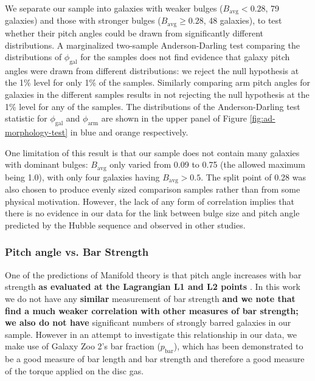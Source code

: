 We separate our sample into galaxies with weaker bulges ($B_\mathrm{avg} < 0.28$, 79 galaxies) and those with stronger bulges ($B_\mathrm{avg} \ge 0.28$, 48 galaxies), to test whether their pitch angles could be drawn from significantly different distributions. A marginalized two-sample Anderson-Darling test comparing the distributions of $\phi_\mathrm{gal}$ for the samples does not find evidence that galaxy pitch angles were drawn from different distributions: we reject the null hypothesis at the 1\% level for only 1\% of the samples. Similarly comparing arm pitch angles for galaxies in the different samples results in not rejecting the null hypothesis at the 1\% level for any of the samples. The distributions of the Anderson-Darling test statistic for $\phi_\mathrm{gal}$ and $\phi_\mathrm{arm}$ are shown in the upper panel of Figure \ref{fig:ad-morphology-test} in blue and orange respectively.

One limitation of this result is that our sample does not contain many galaxies with dominant bulges: $B_\mathrm{avg}$ only varied from 0.09 to 0.75 (the allowed maximum being 1.0), with only four galaxies having $B_\mathrm{avg} > 0.5$. The split point of 0.28 was also chosen to produce evenly sized comparison samples rather than from some physical motivation. However, the lack of any form of correlation implies that there is no evidence in our data for the link between bulge size and pitch angle predicted by the Hubble sequence and observed in other studies.

\subsubsection{Pitch angle vs. Bar Strength}
\label{section:morphology-comparison-bar}

One of the predictions of Manifold theory is that pitch angle increases with bar strength \textbf{as evaluated at the Lagrangian L1 and L2 points}  \citep{2009MNRAS.400.1706A}. In this work we do not have any \textbf{similar} measurement of bar strength \textbf{and we note that \citet{2009MNRAS.400.1706A} find a much weaker correlation with other measures of bar strength; we also do not have} significant numbers of strongly barred galaxies in our sample. However in an attempt to investigate this relationship in our data, we make use of Galaxy Zoo 2's bar fraction ($p_\mathrm{bar}$), which has been demonstrated to be a good measure of bar length \citep{Willett2013:1308.3496v2} and bar strength \citep{2012MNRAS.423.1485S,2012MNRAS.424.2180M,2018MNRAS.473.4731K} and therefore a good measure of the torque applied on the disc gas.


